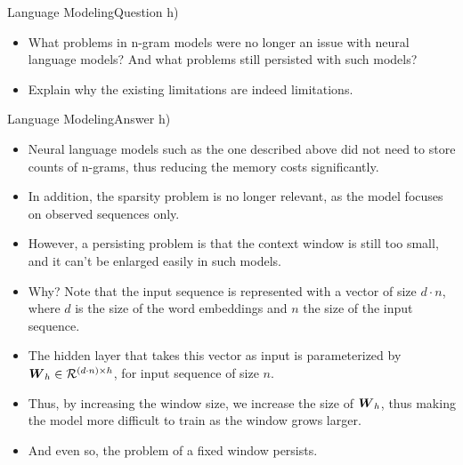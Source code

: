 \documentclass[t]{beamer}
\begin{document}
\begin{frame}{Language Modeling}{Question h)}
    \begin{itemize}
        \item What problems in n-gram models were no longer an issue with neural
              language models? And what problems still persisted with such
              models?
        \item Explain why the existing limitations are indeed limitations.
    \end{itemize}
\end{frame}

\begin{frame}{Language Modeling}{Answer h)}
    \begin{itemize}
        \item Neural language models such as the one described above did not
              need to store counts of n-grams, thus reducing the memory costs
              significantly.
        \item In addition, the sparsity problem is no longer relevant, as the
              model focuses on observed sequences only.
        \item However, a persisting problem is that the context window is still
              too small, and it can't be enlarged easily in such models.
        \item Why? Note that the input sequence is represented with a vector of
              size $d\cdot n$, where $d$ is the size of the word embeddings and
              $n$ the size of the input sequence.
        \item The hidden layer that takes this vector as input is parameterized
              by ${\boldsymbol{W}}_h\in\mathcal{R}^{(d\cdot n)\times h}$, for input sequence of
              size $n$.
        \item Thus, by increasing the window size, we increase the size of
              ${\boldsymbol{W}}_h$, thus making the model more difficult to train as the
              window grows larger.
        \item And even so, the problem of a fixed window persists.
    \end{itemize}
\end{frame}
\end{document}
